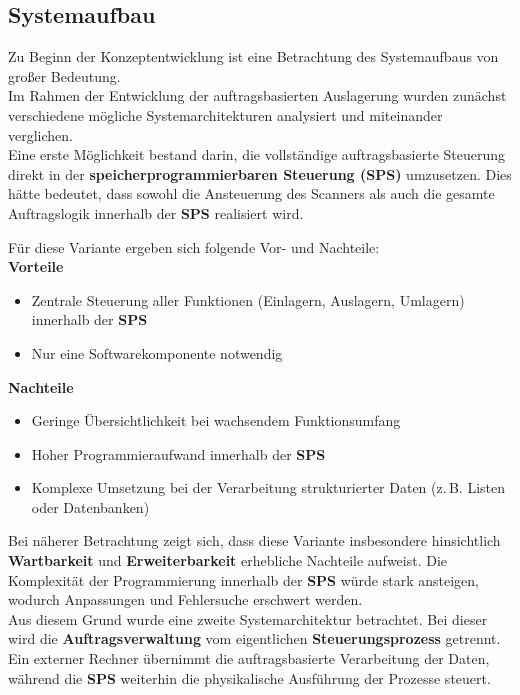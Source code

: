 \subsection{Systemaufbau}

Zu Beginn der Konzeptentwicklung ist eine Betrachtung des Systemaufbaus von großer Bedeutung.\\
Im Rahmen der Entwicklung der auftragsbasierten Auslagerung wurden zunächst verschiedene mögliche Systemarchitekturen analysiert und miteinander verglichen.\\

Eine erste Möglichkeit bestand darin, die vollständige auftragsbasierte Steuerung direkt in der \textbf{speicherprogrammierbaren Steuerung (SPS)} umzusetzen. Dies hätte bedeutet, dass sowohl die Ansteuerung des Scanners als auch die gesamte Auftragslogik innerhalb der \textbf{SPS} realisiert wird.\clearpage

Für diese Variante ergeben sich folgende Vor- und Nachteile:\\

\textbf{Vorteile}
\begin{itemize}
	\item Zentrale Steuerung aller Funktionen (Einlagern, Auslagern, Umlagern) innerhalb der \textbf{SPS}
	\item Nur eine Softwarekomponente notwendig
\end{itemize}

\textbf{Nachteile}
\begin{itemize}
	\item Geringe Übersichtlichkeit bei wachsendem Funktionsumfang
	\item Hoher Programmieraufwand innerhalb der \textbf{SPS}
	\item Komplexe Umsetzung bei der Verarbeitung strukturierter Daten (z.\,B. Listen oder Datenbanken)
\end{itemize}

Bei näherer Betrachtung zeigt sich, dass diese Variante insbesondere hinsichtlich \textbf{Wartbarkeit} und \textbf{Erweiterbarkeit} erhebliche Nachteile aufweist. Die Komplexität der Programmierung innerhalb der \textbf{SPS} würde stark ansteigen, wodurch Anpassungen und Fehlersuche erschwert werden.\\

Aus diesem Grund wurde eine zweite Systemarchitektur betrachtet. Bei dieser wird die \textbf{Auftragsverwaltung} vom eigentlichen \textbf{Steuerungsprozess} getrennt. Ein externer Rechner übernimmt die auftragsbasierte Verarbeitung der Daten, während die \textbf{SPS} weiterhin die physikalische Ausführung der Prozesse steuert.\\

